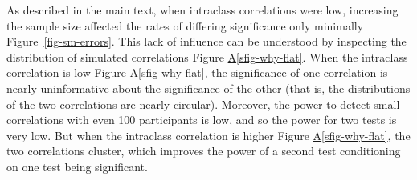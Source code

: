\documentclass[
  authoryear,
  preprint,
  1p]{elsarticle}
\newcommand*\quartosfigref[1]{Figure \hyperref[#1]{A\ref{#1}}}
\begin{document}
As described in the main text, when intraclass correlations were low,
increasing the sample size affected the rates of differing significance
only minimally Figure~\ref{fig-sm-errors}. This lack of influence can be
understood by inspecting the distribution of simulated correlations
\quartosfigref{sfig-why-flat}. When the intraclass correlation is low
\quartosfigref{sfig-why-flat}, the significance of one correlation is
nearly uninformative about the significance of the other (that is, the
distributions of the two correlations are nearly circular). Moreover,
the power to detect small correlations with even 100 participants is
low, and so the power for two tests is very low. But when the intraclass
correlation is higher \quartosfigref{sfig-why-flat}, the two
correlations cluster, which improves the power of a second test
conditioning on one test being significant.

\begin{sfig}


\caption{\label{sfig-why-flat}Correlations from Simulations with
Artificial Data. Points correspond to simulations and are colored based
on statistical significance. The figure shows only a subset of the
simulated sample sizes (rows), only the smallest and largest intraclass
correlations (columns), and only simulations in which the true effect
size (correlation) was 0.1.}

\end{sfig}%
\end{document}
